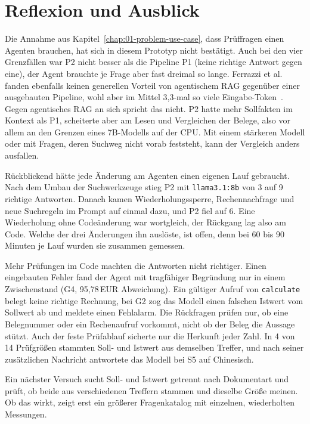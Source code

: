 
\chapter{Reflexion und Ausblick}
\label{chap:06-reflection}


Die Annahme aus Kapitel~\ref{chap:01-problem-use-case}, dass Prüffragen einen Agenten brauchen, hat sich in diesem Prototyp nicht bestätigt. Auch bei den vier Grenzfällen war P2 nicht besser als die Pipeline P1 (keine richtige Antwort gegen eine), der Agent brauchte je Frage aber fast dreimal so lange. Ferrazzi et al. fanden ebenfalls keinen generellen Vorteil von agentischem RAG gegenüber einer ausgebauten Pipeline, wohl aber im Mittel 3,3-mal so viele Eingabe-Token~\cite{ferrazzi2026agentic}. Gegen agentisches RAG an sich spricht das nicht. P2 hatte mehr Sollfakten im Kontext als P1, scheiterte aber am Lesen und Vergleichen der Belege, also vor allem an den Grenzen eines 7B-Modells auf der CPU. Mit einem stärkeren Modell oder mit Fragen, deren Suchweg nicht vorab feststeht, kann der Vergleich anders ausfallen.

Rückblickend hätte jede Änderung am Agenten einen eigenen Lauf gebraucht. Nach dem Umbau der Suchwerkzeuge stieg P2 mit \texttt{llama3.1:8b} von 3 auf 9 richtige Antworten. Danach kamen Wiederholungssperre, Rechennachfrage und neue Suchregeln im Prompt auf einmal dazu, und P2 fiel auf 6. Eine Wiederholung ohne Codeänderung war wortgleich, der Rückgang lag also am Code. Welche der drei Änderungen ihn auslöste, ist offen, denn bei 60 bis 90 Minuten je Lauf wurden sie zusammen gemessen.

Mehr Prüfungen im Code machten die Antworten nicht richtiger. Einen eingebauten Fehler fand der Agent mit tragfähiger Begründung nur in einem Zwischenstand (G4, 95,78\,EUR Abweichung). Ein gültiger Aufruf von \texttt{calculate} belegt keine richtige Rechnung, bei G2 zog das Modell einen falschen Istwert vom Sollwert ab und meldete einen Fehlalarm. Die Rückfragen prüfen nur, ob eine Belegnummer oder ein Rechenaufruf vorkommt, nicht ob der Beleg die Aussage stützt. Auch der feste Prüfablauf sicherte nur die Herkunft jeder Zahl. In 4 von 14 Prüfgrößen stammten Soll- und Istwert aus demselben Treffer, und nach seiner zusätzlichen Nachricht antwortete das Modell bei S5 auf Chinesisch.

Ein nächster Versuch sucht Soll- und Istwert getrennt nach Dokumentart und prüft, ob beide aus verschiedenen Treffern stammen und dieselbe Größe meinen. Ob das wirkt, zeigt erst ein größerer Fragenkatalog mit einzelnen, wiederholten Messungen.
